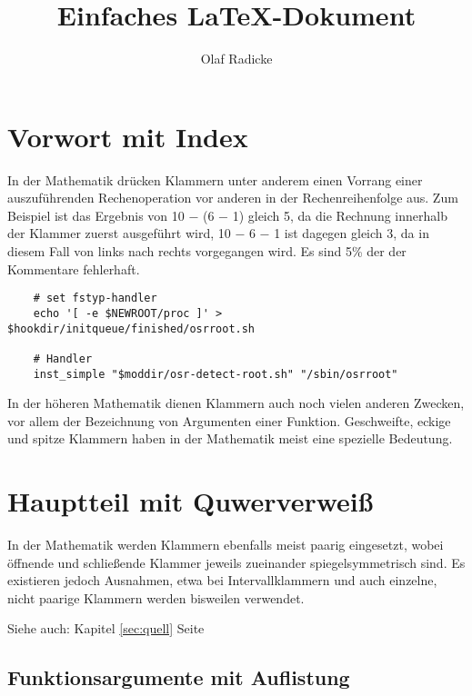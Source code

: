 \documentclass[10pt,a4paper]{article}
\author{Olaf Radicke}
\title{Einfaches LaTeX-Dokument}
\begin{document}

\maketitle

\newpage

\tableofcontents

\newpage

\section {Vorwort mit Index}

In der Mathematik drücken Klammern unter anderem einen Vorrang einer
auszuführenden Rechenoperation vor anderen in der Rechenreihenfolge aus. Zum
Beispiel ist das Ergebnis von 10 − (6 − 1) gleich 5, da
die Rechnung innerhalb %
der Klammer zuerst ausgeführt wird, 10 − 6 − 1 ist dagegen gleich 3, da in
diesem Fall von links nach rechts vorgegangen wird.
Es sind 5\% der der Kommentare fehlerhaft.

\begin{lstlisting}
    # set fstyp-handler
    echo '[ -e $NEWROOT/proc ]' > $hookdir/initqueue/finished/osrroot.sh

    # Handler
    inst_simple "$moddir/osr-detect-root.sh" "/sbin/osrroot"
\end{lstlisting}


In der höheren Mathematik
dienen Klammern auch noch vielen anderen Zwecken, vor allem der Bezeichnung
von Argumenten einer Funktion. Geschweifte, eckige und spitze Klammern haben
in der Mathematik meist eine spezielle Bedeutung.

\section{Hauptteil mit Quwerverweiß}

In der Mathematik werden Klammern ebenfalls meist paarig eingesetzt, wobei
öffnende und schließende Klammer jeweils zueinander spiegelsymmetrisch sind.
Es existieren jedoch Ausnahmen, etwa bei Intervallklammern und auch einzelne,
nicht paarige Klammern werden bisweilen verwendet.

Siehe auch: Kapitel \ref{sec:quell} Seite \pageref{sec:quell}

\subsection{Funktionsargumente mit Auflistung}
\end{document}
